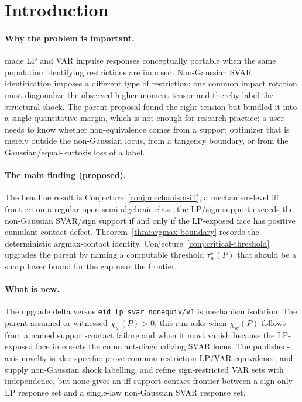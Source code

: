 \documentclass[11pt]{article}
\theoremstyle{definition}
\theoremstyle{plain}
\theoremstyle{remark}
\begin{document}
\section{Introduction}
\paragraph{Why the problem is important.}
\citet{PlagborgMollerWolf2021} made LP and VAR impulse responses conceptually portable when the same population identifying restrictions are imposed.  Non-Gaussian SVAR identification imposes a different type of restriction: one common impact rotation must diagonalize the observed higher-moment tensor and thereby label the structural shock.  The parent proposal found the right tension but bundled it into a single quantitative margin, which is not enough for research practice: a user needs to know whether non-equivalence comes from a support optimizer that is merely outside the non-Gaussian locus, from a tangency boundary, or from the Gaussian/equal-kurtosis loss of a label.

\paragraph{The main finding (proposed).}
The headline result is Conjecture~\ref{conj:mechanism-iff}, a mechanism-level iff frontier: on a regular open semi-algebraic class, the LP/sign support exceeds the non-Gaussian SVAR/sign support if and only if the LP-exposed face has positive cumulant-contact defect.  Theorem~\ref{thm:argmax-boundary} records the deterministic argmax-contact identity.  Conjecture~\ref{conj:critical-threshold} upgrades the parent by naming a computable threshold \(\tau_w^\star(P)\) that should be a sharp lower bound for the gap near the frontier.

\paragraph{What is new.}
The upgrade delta versus \texttt{eid\_lp\_svar\_nonequiv/v1} is mechanism isolation.  The parent assumed or witnessed \(\chi_w(P)>0\); this run asks when \(\chi_w(P)\) follows from a named support-contact failure and when it must vanish because the LP-exposed face intersects the cumulant-diagonalizing SVAR locus.  The published-axis novelty is also specific: \citet{PlagborgMollerWolf2021} prove common-restriction LP/VAR equivalence, \citet{GourierouxMonfortRenne2017} and \citet{LanneMeitzSaikkonen2017} supply non-Gaussian shock labelling, and \citet{DrautzburgWright2023} refine sign-restricted VAR sets with independence, but none gives an iff support-contact frontier between a sign-only LP response set and a single-law non-Gaussian SVAR response set.
\end{document}
